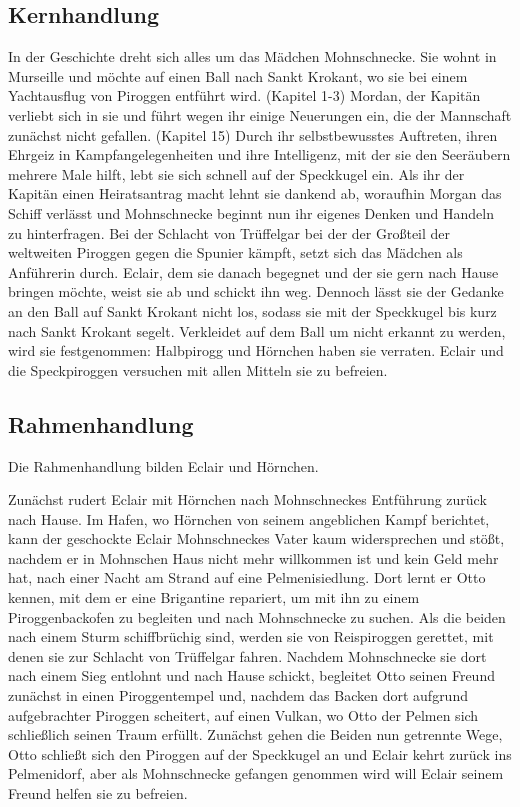 {\subsection{Kernhandlung}
In der Geschichte dreht sich alles um das Mädchen Mohnschnecke. Sie wohnt in Murseille und möchte auf einen Ball nach Sankt Krokant, wo sie bei einem Yachtausflug von Piroggen entführt wird. (Kapitel 1-3) Mordan, der Kapitän verliebt sich in sie und führt wegen ihr einige Neuerungen ein, die der Mannschaft zunächst nicht gefallen. (Kapitel 15) Durch ihr selbstbewusstes Auftreten, ihren Ehrgeiz in Kampfangelegenheiten und ihre Intelligenz, mit der sie den Seeräubern mehrere Male hilft, lebt sie sich schnell auf der Speckkugel ein. Als ihr der Kapitän einen Heiratsantrag macht lehnt sie dankend ab, woraufhin Morgan das Schiff verlässt und Mohnschnecke beginnt nun ihr eigenes Denken und Handeln zu hinterfragen. Bei der Schlacht von Trüffelgar bei der der Großteil der weltweiten Piroggen gegen die Spunier kämpft, setzt sich das Mädchen als Anführerin durch. Eclair, dem sie danach begegnet und der sie gern nach Hause bringen möchte, weist sie ab und schickt ihn weg. Dennoch lässt sie der Gedanke an den Ball auf Sankt Krokant nicht los, sodass sie mit der Speckkugel bis kurz nach Sankt Krokant segelt. Verkleidet auf dem Ball um nicht erkannt zu werden, wird sie festgenommen: Halbpirogg und Hörnchen haben sie verraten. Eclair und die Speckpiroggen versuchen mit allen Mitteln sie zu befreien.

\subsection{Rahmenhandlung}

Die Rahmenhandlung bilden Eclair und Hörnchen.

Zunächst rudert Eclair mit Hörnchen nach Mohnschneckes Entführung zurück nach Hause. Im Hafen, wo Hörnchen von seinem angeblichen Kampf berichtet, kann der geschockte Eclair Mohnschneckes Vater kaum widersprechen und stößt, nachdem er in Mohnschen Haus nicht mehr willkommen ist und kein Geld mehr hat, nach einer Nacht am Strand auf eine Pelmenisiedlung. Dort lernt er Otto kennen, mit dem er eine Brigantine repariert, um mit ihn zu einem Piroggenbackofen zu begleiten und nach Mohnschnecke zu suchen. Als die beiden nach einem Sturm schiffbrüchig sind, werden sie von Reispiroggen gerettet, mit denen sie zur Schlacht von Trüffelgar fahren. Nachdem Mohnschnecke sie dort nach einem Sieg entlohnt und nach Hause schickt, begleitet Otto seinen Freund zunächst in einen Piroggentempel und, nachdem das Backen dort aufgrund aufgebrachter Piroggen scheitert, auf einen Vulkan, wo Otto der Pelmen sich schließlich seinen Traum erfüllt. Zunächst gehen die Beiden nun getrennte Wege, Otto schließt sich den Piroggen auf der Speckkugel an und Eclair kehrt zurück ins Pelmenidorf, aber als Mohnschnecke gefangen genommen wird will Eclair seinem Freund helfen sie zu befreien.

}
